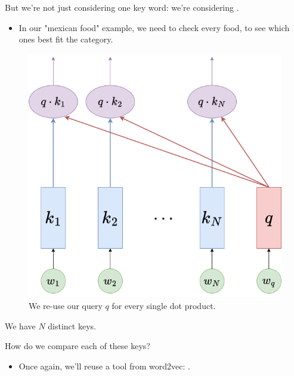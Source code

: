 
        But we're not just considering one key word: we're considering .

        \begin{itemize}
            \item In our "mexican food" example, we need to check every food, to see which ones best fit the category.
        \end{itemize}

        \begin{figure}[H]
            \centering
            \includegraphics[width=0.3\linewidth]{images/transformers_images/k_dot_q_all.png}
            \caption*{We re-use our query $q$ for every single dot product.}
        \end{figure}

        \begin{notation}
            We have $N$ distinct keys.
        \end{notation}


        How do we compare each of these keys?

        \begin{itemize}
            \item Once again, we'll reuse a tool from word2vec: .\\
        \end{itemize}
        

